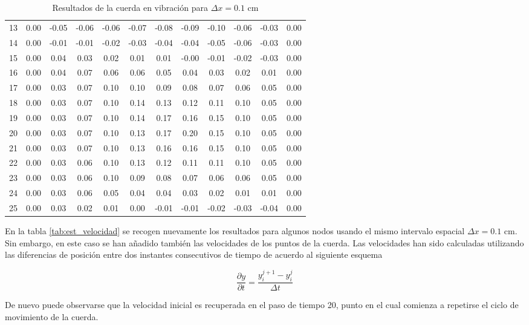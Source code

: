 \documentclass[11pt]{article}
\begin{document}
\begin{table}
\begin{small}
\begin{tabular}{ c c c c c c c c c c c c }
13 & 0.00 & -0.05 & -0.06 & -0.06 & -0.07 & -0.08 & -0.09 & -0.10 & -0.06 & -0.03 & 0.00 \\
14 & 0.00 & -0.01 & -0.01 & -0.02 & -0.03 & -0.04 & -0.04 & -0.05 & -0.06 & -0.03 & 0.00 \\
15 & 0.00 & 0.04 & 0.03 & 0.02 & 0.01 & 0.01 & -0.00 & -0.01 & -0.02 & -0.03 & 0.00 \\
16 & 0.00 & 0.04 & 0.07 & 0.06 & 0.06 & 0.05 & 0.04 & 0.03 & 0.02 & 0.01 & 0.00 \\
17 & 0.00 & 0.03 & 0.07 & 0.10 & 0.10 & 0.09 & 0.08 & 0.07 & 0.06 & 0.05 & 0.00 \\
18 & 0.00 & 0.03 & 0.07 & 0.10 & 0.14 & 0.13 & 0.12 & 0.11 & 0.10 & 0.05 & 0.00 \\
19 & 0.00 & 0.03 & 0.07 & 0.10 & 0.14 & 0.17 & 0.16 & 0.15 & 0.10 & 0.05 & 0.00 \\
\hline
20 & 0.00 & 0.03 & 0.07 & 0.10 & 0.13 & 0.17 & 0.20 & 0.15 & 0.10 & 0.05 & 0.00 \\
\hline
21 & 0.00 & 0.03 & 0.07 & 0.10 & 0.13 & 0.16 & 0.16 & 0.15 & 0.10 & 0.05 & 0.00 \\
22 & 0.00 & 0.03 & 0.06 & 0.10 & 0.13 & 0.12 & 0.11 & 0.11 & 0.10 & 0.05 & 0.00 \\
23 & 0.00 & 0.03 & 0.06 & 0.10 & 0.09 & 0.08 & 0.07 & 0.06 & 0.06 & 0.05 & 0.00 \\
24 & 0.00 & 0.03 & 0.06 & 0.05 & 0.04 & 0.04 & 0.03 & 0.02 & 0.01 & 0.01 & 0.00 \\
25 & 0.00 & 0.03 & 0.02 & 0.01 & 0.00 & -0.01 & -0.01 & -0.02 & -0.03 & -0.04 & 0.00 \\
\end{tabular}
\end{small}
\caption{Resultados de la cuerda en vibración para $\Delta{x} = 0.1$ cm}
\label{tab:est_freq}
\end{table}

En la tabla \ref{tab:est_velocidad} se recogen nuevamente los resultados para algunos nodos
usando el mismo intervalo espacial $\Delta{x} = 0.1$ cm. Sin embargo, en este caso se han
añadido también las velocidades de los puntos de la cuerda. Las velocidades han sido
calculadas utilizando las diferencias de posición entre dos instantes consecutivos de
tiempo de acuerdo al siguiente esquema

\begin{equation}
\frac{\partial{y}}{\partial{t}} = \frac{y^{j + 1}_i - y^{j}_i}{\Delta{t}}
\end{equation} 

De nuevo puede observarse que la velocidad inicial es recuperada en el paso de tiempo 20,
punto en el cual comienza a repetirse el ciclo de movimiento de la cuerda.
\end{document}
